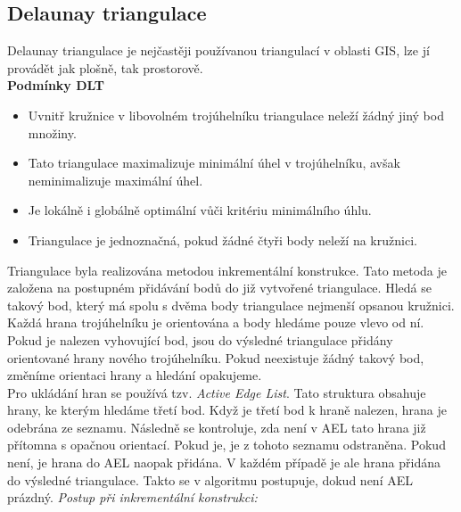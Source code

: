 \documentclass{article}
\begin{document}
\subsection{Delaunay triangulace}
\indent Delaunay triangulace je nejčastěji používanou triangulací v oblasti GIS, lze jí provádět jak plošně, tak prostorově. \\
\textbf{Podmínky DLT}
\begin{itemize}
	\item Uvnitř kružnice v libovolném trojúhelníku triangulace neleží žádný jiný bod množiny.
	\item Tato triangulace maximalizuje minimální úhel v trojúhelníku, avšak neminimalizuje maximální úhel.
	\item Je lokálně i globálně optimální vůči kritériu minimálního úhlu. 
	\item Triangulace je jednoznačná, pokud žádné čtyři body neleží na kružnici.
\end{itemize}
\indent Triangulace byla realizována metodou inkrementální konstrukce. Tato metoda je založena na postupném přidávání bodů do již vytvořené triangulace. Hledá se takový bod, který má spolu s dvěma body triangulace nejmenší opsanou kružnici. Každá hrana trojúhelníku je orientována a body hledáme pouze vlevo od ní. \\
\indent Pokud je nalezen vyhovující bod, jsou do výsledné triangulace přidány orientované hrany nového trojúhelníku. Pokud neexistuje žádný takový bod, změníme orientaci hrany a hledání opakujeme. \\
\indent Pro ukládání hran se používá tzv. \textit{Active Edge List}. Tato struktura obsahuje hrany, ke kterým hledáme třetí bod. Když je třetí bod k hraně nalezen, hrana je odebrána ze seznamu. Následně se kontroluje, zda není v AEL tato hrana již přítomna s opačnou orientací. Pokud je, je z tohoto seznamu odstraněna. Pokud není, je hrana do AEL naopak přidána. V každém případě je ale hrana přidána do výsledné triangulace. Takto se v algoritmu postupuje, dokud není AEL prázdný. 
\textit{Postup při inkrementální konstrukci: }
\end{document}
